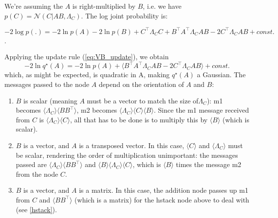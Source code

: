\documentclass{article}
\newcommand{\const}{\textit{const.}}
\newcommand{\qs}{q^\star}
\newcommand{\<}{\langle}
\renewcommand{\>}{\rangle}
\begin{document}
We're assuming the $A$ is right-multiplied by $B$, i.e. we have $p(C) = \mathcal{N}(C | AB, \Lambda_C)$.  The log joint probability is:
	
\begin{equation}
-2 \log p(.) = -2\ln p(A) -2\ln p(B) + C^\top\Lambda_CC + B^\top A^\top \Lambda_C AB -2 C^\top \Lambda_C AB + \const
\end{equation}.  

Applying the update rule (\ref{eq:VB_update}), we obtain
\begin{equation}
-2\ln \qs(A) = -2 \ln p(A) + \< B^\top A^\top \Lambda_C AB -2 C^\top \Lambda_C AB \> + \const
\label{eq:mult1}
\end{equation}
which, as might be expected, is quadratic in A, making $\qs(A)$ a Gaussian. The messages passed to the node $A$ depend on the orientation of $A$ and $B$:
\begin{enumerate}
\item $B$ is scalar (meaning $A$ must be a vector to match the size of$\Lambda_C$): m1 becomes $\<\Lambda_C\>\<BB^\top\>$, m2 becomes $\<\Lambda_C\>\<C\>\<B\>$. Since the m1 message received from $C$ is $\<\Lambda_C\>\<C\>$, all that has to be done is to multiply this by $\<B\>$ (which is scalar).
\item $B$ is a vector, and $A$ is a transposed vector. In this case, $\<C\>$ and $\<\Lambda_C\>$ must be scalar, rendering the order of multiplication unimportant: the messages passed are $\<\Lambda_C\>\<BB^\top\>$ and $\<B\>\<\Lambda_C\>\<C\>$, which is $\<B\>$ times the message m2 from the node $C$.  
\item $B$ is a vector, and $A$ is a matrix.  In this case, the addition node passes up m1 from $C$ and $\<BB^\top\>$ (which is a matrix) for the hstack node above to deal with (see \ref{hstack}).  
\end{enumerate}
\end{document}

